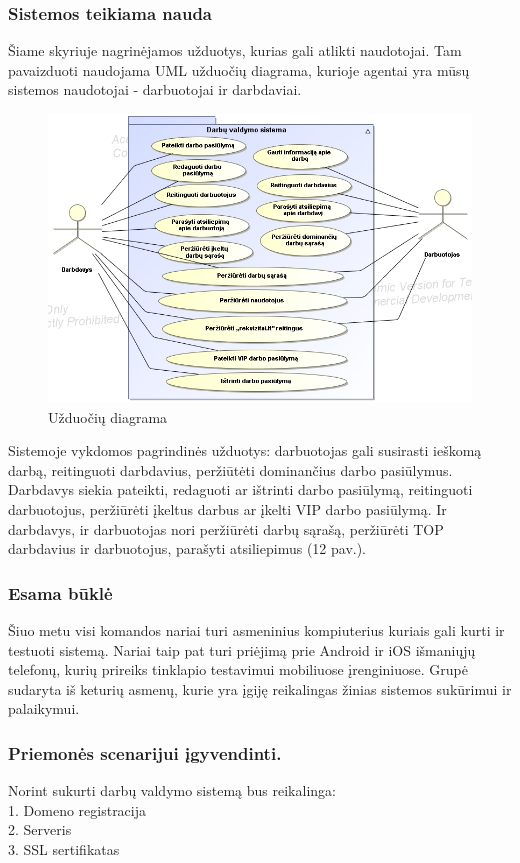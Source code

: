 \documentclass{VUMIFPSkursinis}
\begin{document}
\subsubsection{Sistemos teikiama nauda}
Šiame skyriuje nagrinėjamos užduotys, kurias gali atlikti naudotojai. Tam pavaizduoti naudojama UML užduočių diagrama, kurioje agentai yra mūsų sistemos naudotojai - darbuotojai ir darbdaviai.
\begin{figure}[H]
\centering
\includegraphics[scale=0.7]{img/usecase2.png}
\caption{Užduočių diagrama}
\end{figure}
Sistemoje vykdomos pagrindinės užduotys: darbuotojas gali susirasti ieškomą darbą, reitinguoti darbdavius, peržiūtėti dominančius darbo pasiūlymus. Darbdavys siekia pateikti, redaguoti ar ištrinti darbo pasiūlymą, reitinguoti darbuotojus, peržiūrėti įkeltus darbus  ar įkelti VIP darbo pasiūlymą. Ir darbdavys, ir darbuotojas nori peržiūrėti darbų sąrašą, peržiūrėti TOP darbdavius ir darbuotojus, parašyti atsiliepimus (12 pav.).
\subsubsection{Esama būklė}
Šiuo metu visi komandos nariai turi asmeninius kompiuterius kuriais gali kurti ir testuoti sistemą. Nariai taip pat turi priėjimą prie Android ir iOS išmaniųjų telefonų, kurių prireiks tinklapio testavimui mobiliuose įrenginiuose. Grupė sudaryta iš keturių asmenų, kurie yra įgiję reikalingas žinias sistemos sukūrimui ir palaikymui. 
\subsubsection{Priemonės scenarijui įgyvendinti.}
Norint sukurti darbų valdymo sistemą bus reikalinga:\\
\hspace*{2cm} 1. Domeno registracija\\
\hspace*{2cm} 2. Serveris\\
\hspace*{2cm} 3. SSL sertifikatas\\
\end{document}

